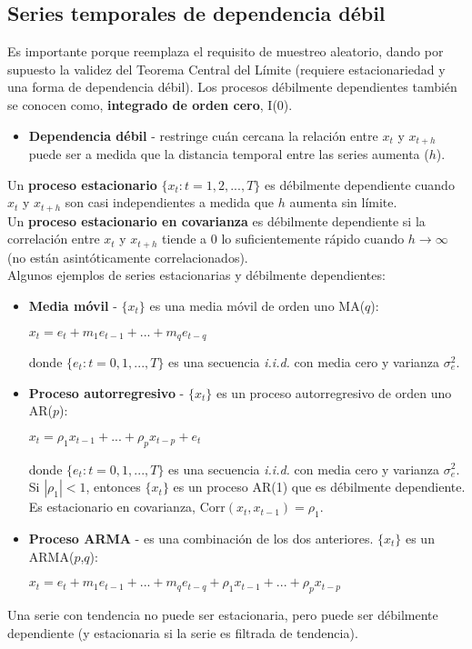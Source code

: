 \documentclass[10pt, a4paper, landscape]{extarticle}
\newcommand{\Corr}{\mathrm{Corr}}
\begin{document}
\begin{multicols}{3}
	\subsection*{Series temporales de dependencia débil}
		Es importante porque reemplaza el requisito de muestreo aleatorio, dando por supuesto la validez del Teorema Central del Límite (requiere estacionariedad y una forma de dependencia débil). Los procesos débilmente dependientes también se conocen como, \textbf{integrado de orden cero}, I(0).
		\begin{itemize}[leftmargin=*]
			\item \textbf{Dependencia débil} - restringe cuán cercana la relación entre $x_t$ y $x_{t+h}$ puede ser a medida que la distancia temporal entre las series aumenta ($h$).
		\end{itemize}
		Un \textbf{proceso estacionario} $\lbrace x_t: t = 1, 2, ..., T \rbrace$ es débilmente dependiente cuando $x_t$ y $x_{t+h}$ son casi independientes a medida que $h$ aumenta sin límite. \\
		Un \textbf{proceso estacionario en covarianza} es débilmente dependiente si la correlación entre $x_t$ y $x_{t+h}$ tiende a $0$ lo suficientemente rápido cuando $h \rightarrow \infty$ (no están asintóticamente correlacionados). \\
		Algunos ejemplos de series estacionarias y débilmente dependientes:
		\begin{itemize}[leftmargin=*]
			\item \textbf{Media móvil} - $\lbrace x_t \rbrace$ es una media móvil de orden uno MA($q$):
			\begin{center}
				$x_t = e_t + m_1 e_{t-1} + ... + m_q e_{t-q}$
			\end{center}
			donde $\lbrace e_t: t = 0, 1, ..., T \rbrace$ es una secuencia \textsl{i.i.d.} con media cero y varianza $\sigma^2_e$.
			\item \textbf{Proceso autorregresivo} - $\lbrace x_t \rbrace$ es un proceso autorregresivo de orden uno AR($p$):
			\begin{center}
				$x_t = \rho_1 x_{t-1} + ... + \rho_p x_{t-p} + e_t$
			\end{center}
			donde $\lbrace e_t: t = 0, 1, ..., T \rbrace$ es una secuencia \textsl{i.i.d.} con media cero y varianza $\sigma^2_e$. \\
			Si $|\rho_1|<1$, entonces $\lbrace x_t \rbrace$ es un proceso AR(1) que es débilmente dependiente. Es estacionario en covarianza, $\Corr(x_t, x_{t-1}) = \rho_1$.
			\item \textbf{Proceso ARMA} - es una combinación de los dos anteriores. $\lbrace x_t \rbrace$ es un ARMA($p$,$q$):
			\begin{center}
				$x_t = e_t + m_1 e_{t-1} + ... + m_q e_{t-q} + \rho_1 x_{t-1} + ... + \rho_p x_{t-p}$
			\end{center}
		\end{itemize}
		Una serie con tendencia no puede ser estacionaria, pero puede ser débilmente dependiente (y estacionaria si la serie es filtrada de tendencia).
\columnbreak

\end{multicols}
\end{document}
